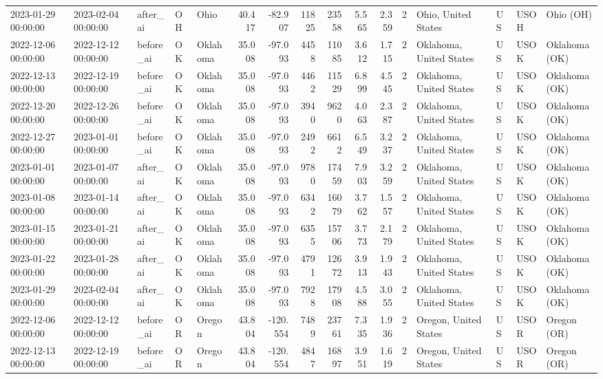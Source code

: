 \begin{tabular}{lllllrrrrrrlllll}
2023-01-29 00:00:00 & 2023-02-04 00:00:00 & after\_ai & OH & Ohio & 40.417 & -82.907 & 11825 & 23558 & 5.565 & 2.359 & 2 & Ohio, United States & US & USOH & Ohio (OH) \\
2022-12-06 00:00:00 & 2022-12-12 00:00:00 & before\_ai & OK & Oklahoma & 35.008 & -97.093 & 4458 & 11085 & 3.612 & 1.715 & 2 & Oklahoma, United States & US & USOK & Oklahoma (OK) \\
2022-12-13 00:00:00 & 2022-12-19 00:00:00 & before\_ai & OK & Oklahoma & 35.008 & -97.093 & 4462 & 11529 & 6.899 & 4.545 & 2 & Oklahoma, United States & US & USOK & Oklahoma (OK) \\
2022-12-20 00:00:00 & 2022-12-26 00:00:00 & before\_ai & OK & Oklahoma & 35.008 & -97.093 & 3940 & 9620 & 4.063 & 2.387 & 2 & Oklahoma, United States & US & USOK & Oklahoma (OK) \\
2022-12-27 00:00:00 & 2023-01-01 00:00:00 & before\_ai & OK & Oklahoma & 35.008 & -97.093 & 2492 & 6612 & 6.549 & 3.237 & 2 & Oklahoma, United States & US & USOK & Oklahoma (OK) \\
2023-01-01 00:00:00 & 2023-01-07 00:00:00 & after\_ai & OK & Oklahoma & 35.008 & -97.093 & 9780 & 17459 & 7.903 & 3.259 & 2 & Oklahoma, United States & US & USOK & Oklahoma (OK) \\
2023-01-08 00:00:00 & 2023-01-14 00:00:00 & after\_ai & OK & Oklahoma & 35.008 & -97.093 & 6342 & 16079 & 3.762 & 1.557 & 2 & Oklahoma, United States & US & USOK & Oklahoma (OK) \\
2023-01-15 00:00:00 & 2023-01-21 00:00:00 & after\_ai & OK & Oklahoma & 35.008 & -97.093 & 6355 & 15706 & 3.773 & 2.179 & 2 & Oklahoma, United States & US & USOK & Oklahoma (OK) \\
2023-01-22 00:00:00 & 2023-01-28 00:00:00 & after\_ai & OK & Oklahoma & 35.008 & -97.093 & 4791 & 12672 & 3.913 & 1.943 & 2 & Oklahoma, United States & US & USOK & Oklahoma (OK) \\
2023-01-29 00:00:00 & 2023-02-04 00:00:00 & after\_ai & OK & Oklahoma & 35.008 & -97.093 & 7928 & 17908 & 4.588 & 3.055 & 2 & Oklahoma, United States & US & USOK & Oklahoma (OK) \\
2022-12-06 00:00:00 & 2022-12-12 00:00:00 & before\_ai & OR & Oregon & 43.804 & -120.554 & 7489 & 23761 & 7.335 & 1.936 & 2 & Oregon, United States & US & USOR & Oregon (OR) \\
2022-12-13 00:00:00 & 2022-12-19 00:00:00 & before\_ai & OR & Oregon & 43.804 & -120.554 & 4847 & 16897 & 3.951 & 1.619 & 2 & Oregon, United States & US & USOR & Oregon (OR) \\

\end{tabular}
